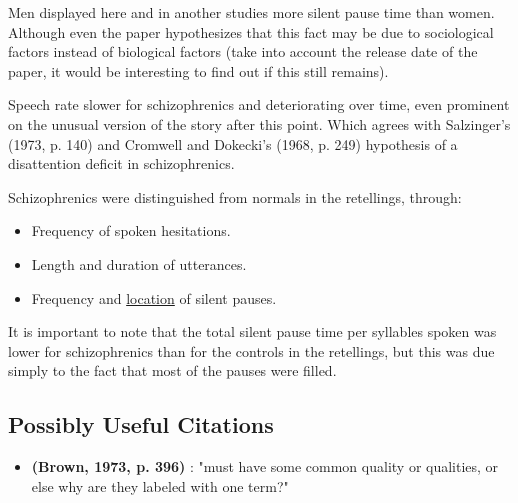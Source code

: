 \documentclass{Paper_Summary}
\begin{document}
    Men displayed here and in another studies more silent pause time than women. Although even the paper hypothesizes that this fact may be due to sociological factors instead of biological factors (take into account the release date of the paper, it would be interesting to find out if this still remains).

    Speech rate slower for schizophrenics and deteriorating over time, even prominent on the unusual version of the story after this point. Which agrees with Salzinger's (1973, p. 140) and Cromwell and Dokecki's (1968, p. 249) hypothesis of a disattention deficit in schizophrenics.

    Schizophrenics were distinguished from normals in the retellings, through:
    \begin{itemize}
        \item Frequency of spoken hesitations.
        \item Length and duration of utterances.
        \item Frequency and \underline{location} of silent pauses.
    \end{itemize}


    It is important to note that the total silent pause time per syllables spoken was lower for schizophrenics than for the controls in the retellings, but this was due simply to the fact that most of the pauses were filled.

\breakline

\begin{center}
    \section*{Possibly Useful Citations}
\end{center}

    \begin{itemize}
        \item \textbf{(Brown, 1973, p. 396)} : "must have some common quality or qualities, or else why are they labeled with one term?"
    \end{itemize}
\end{document}
